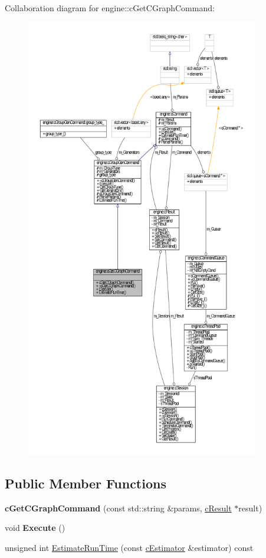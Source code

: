 \-Collaboration diagram for engine\-:\-:c\-Get\-C\-Graph\-Command\-:
\nopagebreak
\begin{figure}[H]
\begin{center}
\leavevmode
\includegraphics[height=550pt]{classengine_1_1cGetCGraphCommand__coll__graph}
\end{center}
\end{figure}
\subsection*{\-Public \-Member \-Functions}
\begin{DoxyCompactItemize}
\item 
\hypertarget{classengine_1_1cGetCGraphCommand_aaf87f44392cf780bd4308e8d6dc3139d}{{\bfseries c\-Get\-C\-Graph\-Command} (const std\-::string \&params, \hyperlink{classengine_1_1cResult}{c\-Result} $\ast$result)}\label{classengine_1_1cGetCGraphCommand_aaf87f44392cf780bd4308e8d6dc3139d}

\item 
\hypertarget{classengine_1_1cGetCGraphCommand_a94b83bc4b3103138411ec5bf1ccca84c}{void {\bfseries \-Execute} ()}\label{classengine_1_1cGetCGraphCommand_a94b83bc4b3103138411ec5bf1ccca84c}

\item 
unsigned int \hyperlink{classengine_1_1cGetCGraphCommand_a0a3d07c4f82227b7f0ffbcf01f7fcec2}{\-Estimate\-Run\-Time} (const \hyperlink{classengine_1_1cEstimator}{c\-Estimator} \&estimator) const 
\end{DoxyCompactItemize}


